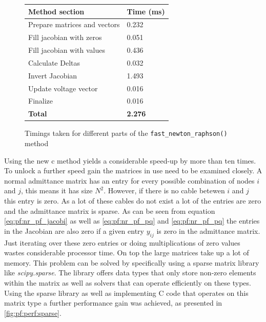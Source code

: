 \begin{figure}[H]
    \begin{center}
        \begin{tabular}{ll}
            \textbf{Method section} & \textbf{Time (ms)}\\
            \hline
            Prepare matrices and vectors & 0.232\\
            Fill jacobian with zeros &  0.051\\
            Fill jacobian with values & 0.436\\
            Calculate Deltas &      0.032\\
            Invert Jacobian &      1.493\\
            Update voltage vector & 0.016\\
            Finalize & 0.016\\
            \hline
            \textbf{Total} & \textbf{2.276}
        \end{tabular}
    \end{center}
\caption{Timings taken for different parts of the \texttt{fast\_newton\_raphson()} method}
\label{fig:pf:perf:improved}
\end{figure}

Using the new c method yields a considerable speed-up by more than ten times.\\

To unlock a further speed gain the matrices in use need to be examined closely. A normal admittance matrix has 
an entry for every possible combination of nodes $i$ and $j$, this means it has size $N^2$. However, if there is
no cable betewen $i$ and $j$ this entry is zero. As a lot of these cables do not exist a lot of the entries are zero
and the admittance matrix is sparse.
As can be seen from equation \ref{eq:pf:nr_pf_jacobi} as well as \ref{eq:pf:nr_pf_pq} and \ref{eq:pf:nr_pf_pq} the entries
in the Jacobian are also zero if a given entry $y_{ij}$ is zero in the admittance matrix.\\
Just iterating over these zero entries or doing multiplications of zero values wastes considerable processor time. On top
the large matrices take up a lot of memory. This problem can be solved by specifically using
a sparse matrix library like \textit{scipy.sparse}\autocite{2020SciPy-NMeth}. The library offers
data types that only store non-zero elements within the matrix as well as solvers that can operate
efficiently on these types.\\
Using the sparse library as well as implementing C code that operates on this matrix type a
further performance gain was achieved, as presented in \autoref{fig:pf:perf:sparse}.


